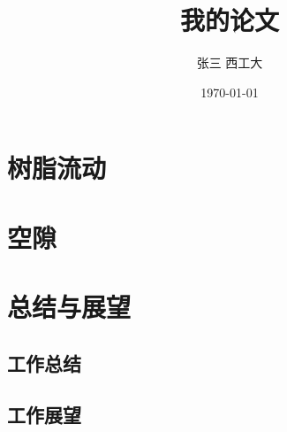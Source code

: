 \documentclass[a4paper,twoside,AutoFakeBold,scheme=chinese]{ctexbook}
\title{\heiti \zihao{3}我的论文}
\author{\kaishu \zihao{4} 张三 \songti \zihao{4}西工大}
\date{\today}
\begin{document}
 
	\maketitle
	\thispagestyle{empty}
	\frontmatter %
    
    \thispagestyle{empty}
    
    \thispagestyle{empty}
    \tableofcontents

	\mainmatter %
	
	\thispagestyle{empty}
	
	
	\chapter{树脂流动}
	\chapter{空隙}
	\chapter{总结与展望}\label{conclusion}
	\section{工作总结}
	\section{工作展望}
	\backmatter %
	
	\nocite{*}
\end{document}
